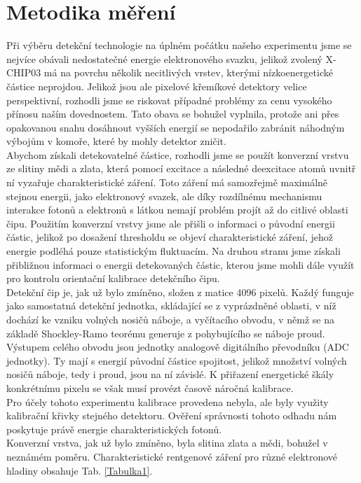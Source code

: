 \section{Metodika měření}
Při výběru detekční technologie na úplném počátku našeho experimentu jsme se nejvíce obávali nedostatečné energie elektronového svazku, jelikož zvolený X-CHIP03 má na povrchu několik necitlivých vrstev, kterými nízkoenergetické částice neprojdou. Jelikož jsou ale pixelové křemíkové detektory velice perspektivní, rozhodli jsme se riskovat případné problémy za cenu vysokého přínosu naším dovednostem. Tato obava se bohužel vyplnila, protože ani přes opakovanou snahu dosáhnout vyšších energií se nepodařilo zabránit náhodným výbojům v komoře, které by mohly detektor zničit.\\
Abychom získali detekovatelné částice, rozhodli jsme se použít konverzní vrstvu ze slitiny mědi a zlata, která pomocí excitace a následné deexcitace atomů uvnitř ní vyzařuje charakteristické záření. Toto záření má samozřejmě maximálně stejnou energii, jako elektronový svazek, ale díky rozdílnému mechanismu interakce fotonů a elektronů s látkou nemají problém projít až do citlivé oblasti čipu. Použitím konverzní vrstvy jsme ale přišli o informaci o původní energii částic, jelikož po dosažení thresholdu se objeví charakteristické záření, jehož energie podléhá pouze statistickým fluktuacím. Na druhou stranu jsme získali přibližnou informaci o energii detekovaných částic, kterou jsme mohli dále využít pro kontrolu orientační kalibrace detekčního čipu.\\
Detekční čip je, jak už bylo zmíněno, složen z matice 4096 pixelů. Každý funguje jako samostatná detekční jednotka, skládající se z vyprázdněné oblasti, v níž dochází ke vzniku volných nosičů náboje, a vyčítacího obvodu, v němž se na základě Shockley-Ramo teorému generuje z pohybujícího se náboje proud. Výstupem celého obvodu jsou jednotky analogově digitálního převodníku (ADC jednotky). Ty mají s energií původní částice spojitost, jelikož množství volných nosičů náboje, tedy i proud, jsou na ní závislé. K přiřazení energetické škály konkrétnímu pixelu se však musí provézt časově náročná kalibrace.\\
Pro účely tohoto experimentu kalibrace provedena nebyla, ale byly využity kalibrační křivky stejného detektoru. Ověření správnosti tohoto odhadu nám poskytuje právě energie charakteristických fotonů.\\
Konverzní vrstva, jak už bylo zmíněno, byla slitina zlata a mědi, bohužel v neznámém poměru. Charakteristické rentgenové záření pro různé elektronové hladiny obsahuje Tab. \ref{Tabulka1}.

